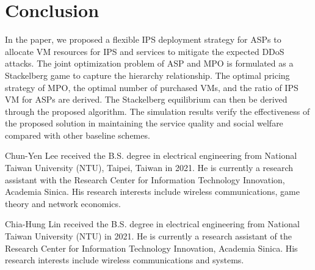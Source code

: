 \documentclass[10pt,journal, compsoc]{IEEEtran}
\begin{document}

\section{Conclusion} \label{sec:conclusion}
In the paper, we proposed a flexible IPS deployment strategy for ASPs to allocate VM resources for IPS and services to mitigate the expected DDoS attacks. The joint optimization problem of ASP and MPO is formulated as a Stackelberg game to capture the hierarchy relationship. The optimal pricing strategy of MPO, the optimal number of purchased VMs, and the ratio of IPS VM for ASPs are derived. The Stackelberg equilibrium can then be derived through the proposed algorithm. The simulation results verify the effectiveness of the proposed solution in maintaining the service quality and social welfare compared with other baseline schemes.




\iffalse
\begin{IEEEbiography}{Chun-Yen Lee}
received the B.S. degree in electrical engineering from National Taiwan University (NTU), Taipei, Taiwan in 2021. He is currently a research assistant with the Research Center for Information Technology Innovation, Academia Sinica. His research interests include wireless communications, game theory and network economics.
\end{IEEEbiography}


\begin{IEEEbiography}{Chia-Hung Lin}
received the B.S. degree in electrical engineering from National Taiwan University (NTU) in 2021. He is currently a research assistant of the Research Center for Information Technology Innovation, Academia Sinica. His research interests include wireless communications and systems.
\end{IEEEbiography}
\end{document}
